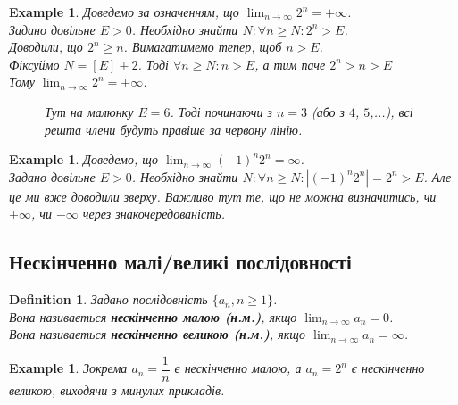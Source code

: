 \documentclass[a4paper, 14pt]{article}
\def\huge{\displaystyle}
\theoremstyle{theoremdd}
\theoremstyle{theoremdd}
\newtheorem{definition}[theorem]{Definition}
\theoremstyle{theoremdd}
\theoremstyle{theoremdd}
\newtheorem{example}[theorem]{Example}
\theoremstyle{theoremdd}
\theoremstyle{theoremdd}
\theoremstyle{theoremdd}
\theoremstyle{theoremdd}
\begin{document}
	\begin{example}
	Доведемо за означенням, що $\displaystyle\lim_{n \to \infty} 2^n = +\infty$.\\
	Задано довільне $E>0$. Необхідно знайти $N: \forall n \geq N: 2^n>E$.\\
	Доводили, що $2^n \geq n$. Вимагатимемо тепер, щоб $n > E$.\\
	Фіксуймо $N=\left[ E \right] + 2$. Тоді $\forall n \geq N: n > E$, а тим паче $2^n > n > E$\\
	Тому $\displaystyle\lim_{n \to \infty} 2^n = +\infty$.
	\begin{figure}[H]
\centering
\resizebox{0.9\textwidth}{!} {
}
\caption*{Тут на малюнку $E = 6$. Тоді починаючи з $n=3$ (або з $4$, $5$,...), всі решта члени будуть правіше за червону лінію.}
\end{figure}
	\end{example}

\begin{example}
Доведемо, що $\huge \lim_{n \to \infty} (-1)^n 2^n = \infty$.\\
Задано довільне $E > 0$. Необхідно знайти $N: \forall n \geq N: |(-1)^n 2^n| = 2^n > E$.
Але це ми вже доводили зверху. Важливо тут те, що не можна визначитись, чи $+\infty$, чи $-\infty$ через знакочередованість.
\end{example}
	
	
	\subsection{Нескінченно малі/великі послідовності}
	\begin{definition}
	Задано послідовність $\{a_n, n \geq 1\}$.\\
	Вона називається \textbf{нескінченно малою (н.м.)}, якщо $\huge\lim_{n \to \infty} a_n = 0$.\\
	Вона називається \textbf{нескінченно великою (н.м.)}, якщо $\huge\lim_{n \to \infty} a_n = \infty$.\\
	\end{definition}
	
	\begin{example}
	Зокрема $a_n = \dfrac{1}{n}$ є нескінченно малою, а $a_n = 2^n$ є нескінченно великою, виходячи з минулих прикладів.
	\end{example}
	
\end{document}
